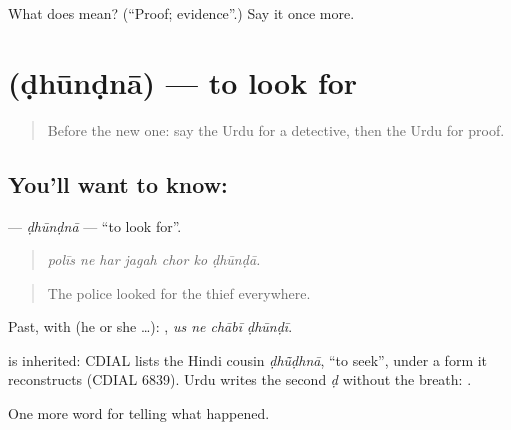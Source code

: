 \begin{tcolorbox}[breakable,colback=teal!4,colframe=teal!35!black,title={Before you move on}]
What does  mean? (\textquotedblleft{}Proof; evidence\textquotedblright{}.) Say it once more.
\end{tcolorbox}
\section[\texorpdfstring{\ur{ڈھونڈنا} (ḍhūnḍnā)}{ڈھونڈنا (ḍhūnḍnā)}]{ (ḍhūnḍnā) — to look for}

\label{lesson:UR-C282-dhundna}



\begin{quote}
Before the new one: say the Urdu for a detective, then the Urdu for proof.
\end{quote}

\subsection*{You'll want to know: }
\textbf{} — \emph{ḍhūnḍnā} — \textquotedblleft{}to look for\textquotedblright{}.

\begin{quote}
      
\end{quote}

\begin{quote}
\emph{polīs ne har jagah chor ko ḍhūnḍā.}
\end{quote}

\begin{quote}
The police looked for the thief everywhere.
\end{quote}

Past, with  (he or she …):    , \emph{us ne chābī ḍhūnḍī}.

\begin{cousinweb}
is inherited: CDIAL lists the Hindi cousin \emph{ḍhū̃ḍhnā}, \textquotedblleft{}to seek\textquotedblright{}, under a form it reconstructs (CDIAL 6839). Urdu writes the second \emph{ḍ} without the breath: \textbf{}.
\end{cousinweb}

\begin{grammarlens}[title={What you've built}]
One more word for telling what happened.
\end{grammarlens}

